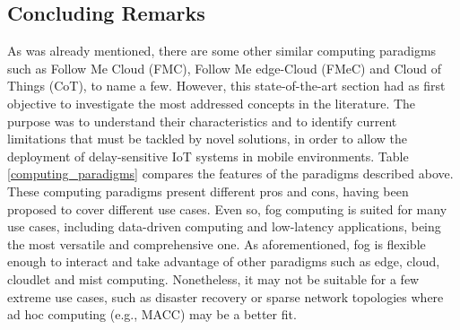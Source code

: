 \subsection{Concluding Remarks}
As was already mentioned, there are some other similar computing paradigms such as Follow Me Cloud (FMC), Follow Me edge-Cloud (FMeC) and Cloud of Things (CoT), to name a few. However, this state-of-the-art section had as first objective to investigate the most addressed concepts in the literature. The purpose was to understand their characteristics and to identify current limitations that must be tackled by novel solutions, in order to allow the deployment of delay-sensitive IoT systems in mobile environments. Table \ref{computing_paradigms} compares the features of the paradigms described above.\\
\noindent\tab These computing paradigms present different pros and cons, having been proposed to cover different use cases. Even so, fog computing is suited for many use cases, including data-driven computing and low-latency applications, being the most versatile and comprehensive one. As aforementioned, fog is flexible enough to interact and take advantage of other paradigms such as edge, cloud, cloudlet and mist computing. Nonetheless, it may not be suitable for a few extreme use cases, such as disaster recovery or sparse network topologies where ad hoc computing (e.g., MACC) may be a better fit.
